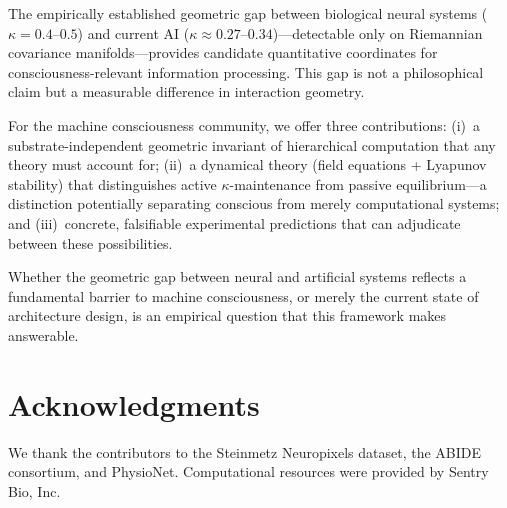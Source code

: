 \documentclass[letterpaper]{article}
\begin{document}
The empirically established geometric gap between
biological neural systems ($\kappa=0.4$--$0.5$) and
current AI ($\kappa\approx0.27$--$0.34$)---detectable
only on Riemannian covariance manifolds---provides
candidate quantitative coordinates for
consciousness-relevant information processing.
This gap is not a philosophical claim but a
measurable difference in interaction geometry.

For the machine consciousness community, we offer
three contributions:
(i)~a substrate-independent geometric invariant of
hierarchical computation that any theory must account
for;
(ii)~a dynamical theory (field equations +
Lyapunov stability) that distinguishes active
$\kappa$-maintenance from passive equilibrium---a
distinction potentially separating conscious from
merely computational systems; and
(iii)~concrete, falsifiable experimental predictions
that can adjudicate between these possibilities.

Whether the geometric gap between neural and artificial
systems reflects a fundamental barrier to machine
consciousness, or merely the current state of
architecture design, is an empirical question that
this framework makes answerable.

\section*{Acknowledgments}

We thank the contributors to the Steinmetz Neuropixels
dataset, the ABIDE consortium, and PhysioNet.
Computational resources were provided by Sentry Bio,
Inc.



\end{document}
